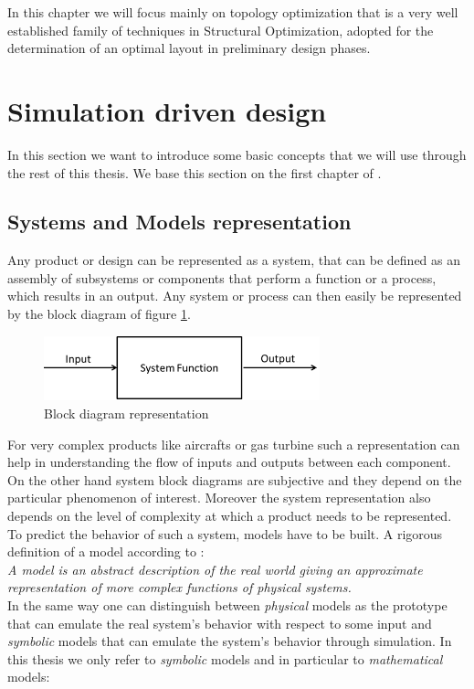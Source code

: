 In this chapter we will focus mainly on topology optimization that is a very well established family of techniques in Structural Optimization, adopted for the determination of an optimal layout in preliminary design phases.
\section{Simulation driven design}
\label{sec:2.1}
In this section we want to introduce some basic concepts that we will use through the rest of this thesis. We base this section on the first chapter of \cite{papalambros2000principles}.
\subsection{Systems and Models representation}
Any product or design can be represented as a system, that can be defined as an assembly of subsystems or components that perform a function or a process, which results in an output. Any system or process can then easily be represented by the block diagram of figure \ref{fig.2.1}.
\begin{figure}[ht]
\centering
\includegraphics[width=8cm]{images/Ch2/Block_diagram_rep}
\caption{Block diagram representation}
\label{fig.2.1}
\end{figure}
For very complex products like aircrafts or gas turbine such a representation can help in understanding the flow of inputs and outputs between each component. On the other hand system block diagrams are subjective and they depend on the particular phenomenon of interest. Moreover the system representation also depends on the level of complexity at which a product needs to be represented. To predict the behavior of such a system, models have to be built. A rigorous definition of a model according to \cite{papalambros2000principles}:\\
\textit{A model is an abstract description of the real world giving an approximate representation of more complex functions of physical systems.}\\
In the same way one can distinguish between \textit{physical} models as the prototype that can emulate the real system's behavior with respect to some input and \textit{symbolic} models that can emulate the system's behavior through simulation. In this thesis we only refer to \textit{symbolic} models and in particular to \textit{mathematical} models:\\
